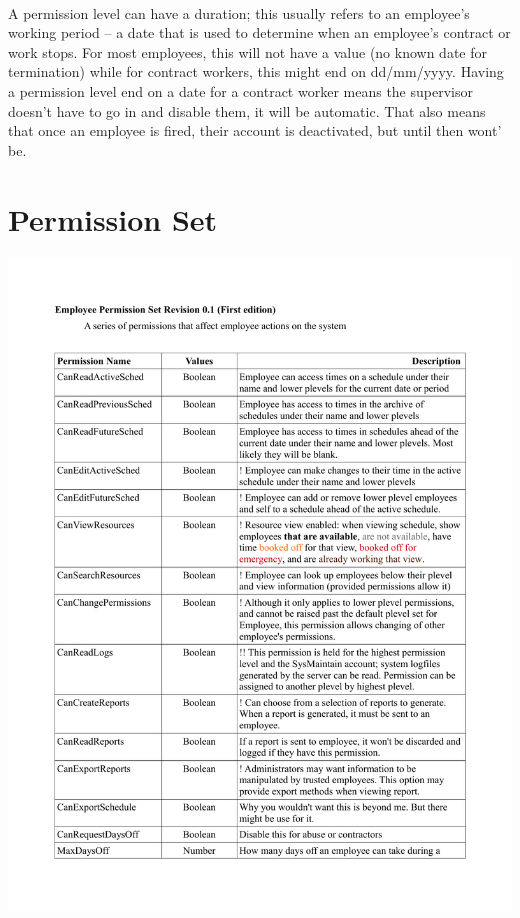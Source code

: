 \documentclass[letterpaper,12pt]{report}
\begin{document}
\paragraph*{}\hspace{0.6cm}A permission level can have a duration; this usually refers to an employee's working period – a date that is used to determine when an employee's contract or work stops. For most employees, this will not have a value (no known date for termination) while for contract workers, this might end on dd/mm/yyyy. Having a permission level end on a date for a contract worker means the supervisor doesn't have to go in and disable them, it will be automatic. That also means that once an employee is fired, their account is deactivated, but until then wont' be.

\pagebreak
\section{Permission Set}
\includegraphics[scale=0.8, trim=10mm 0mm 0mm 0mm]{externals/PermissionTable1.pdf}
\end{document}
